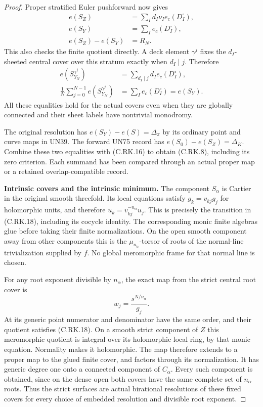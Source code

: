 \begin{proof}
Proper stratified Euler
pushforward now gives
\[
 \begin{split}
 e(S_Z)&=\sum_I d_I\nu_I e_c(D_I^\circ),\\
 e(S_Y)&=\sum_I e_c(D_I^\circ),\\
 e(S_Z)-e(S_Y)&=R_N.
 \end{split}
\tag{C.RK.16}
\]
This also checks the finite
quotient directly. A deck
element $\gamma^j$ fixes the
$d_I$-sheeted central cover
over this stratum exactly
when $d_I\mid j$. Therefore
\[
 \begin{split}
 e(S_{Y_N}^{\gamma^j})
       &=\sum_{d_I\mid j}d_I e_c(D_I^\circ),\\
 \frac1N\sum_{j=0}^{N-1}
          e(S_{Y_N}^{\gamma^j})
       &=\sum_I e_c(D_I^\circ)=e(S_Y).
 \end{split}
\tag{C.RK.17}
\]
All these equalities hold for
the actual covers even when
they are globally connected
and their sheet labels have
nontrivial monodromy.

The original resolution has
$e(S_Y)-e(S)=\Delta_\pi$ by
its ordinary point and curve
maps in UN39. The forward
UN75 record has
$e(S_0)-e(S_Z)=\Delta_K$.
Combine these two equalities
with (C.RK.16) to obtain
(C.RK.8), including its zero
criterion. Each summand has
been compared through an
actual proper map or a
retained overlap-compatible
record.

\par\medskip\noindent\textbf{Intrinsic covers and the intrinsic minimum.}
The component $S_\alpha$ is Cartier
in the original smooth threefold.
Its local equations satisfy
$g_k=v_{kj}g_j$ for holomorphic
units, and therefore
$u_k=v_{kj}^{-n_\alpha}u_j$.
This is precisely the transition
in (C.RK.18), including its cocycle
identity. The corresponding monic
finite algebras glue before taking
their finite normalizations.
On the open smooth component
away from other components this
is the $\mu_{n_\alpha}$-torsor
of roots of the normal-line
trivialization supplied by $f$.
No global meromorphic frame for
that normal line is chosen.

For any root exponent divisible
by $n_\alpha$, the exact map from
the strict central root cover is
\[
                         w_j=\frac{s^{N/n_\alpha}}{g_j}.
\tag{C.RK.21}
\]
At its generic point numerator
and denominator have the same
order, and their quotient satisfies
(C.RK.18). On a smooth strict
component of $Z$ this meromorphic
quotient is integral over its
holomorphic local ring, by that
monic equation. Normality makes
it holomorphic. The map therefore
extends to a proper map to the
glued finite cover, and factors
through its normalization. It
has generic degree one onto a
connected component of $C_\alpha$.
Every such component is obtained,
since on the dense open both
covers have the same complete
set of $n_\alpha$ roots.
Thus the strict surfaces are
actual birational resolutions
of these fixed covers for every
choice of embedded resolution
and divisible root exponent.


\end{proof}
